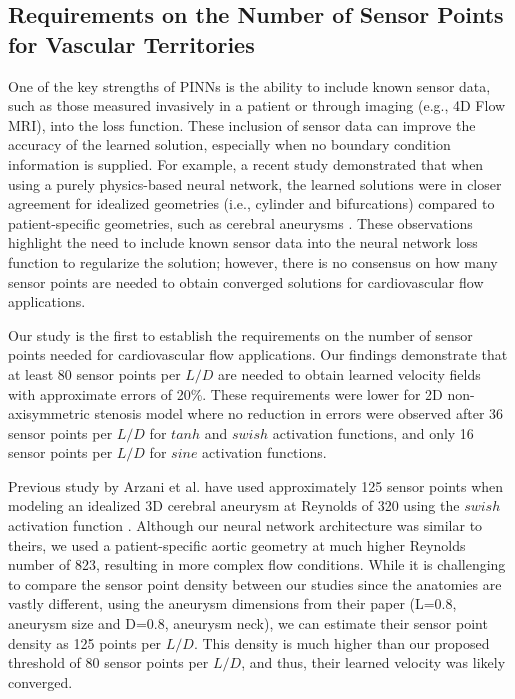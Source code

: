 \documentclass[times,twocolumn,final]{elsarticle}
\begin{document}
{\subsection {Requirements on the Number of Sensor Points for Vascular Territories}
One of the key strengths of PINNs is the ability to include known sensor data, such as those measured invasively in a patient or through imaging (e.g., 4D Flow MRI), into the loss function. These inclusion of sensor data can improve the accuracy of the learned solution, especially when no boundary condition information is supplied. For example, a recent study demonstrated that when using a purely physics-based neural network, the learned solutions were in closer agreement for idealized geometries (i.e., cylinder and bifurcations) compared to patient-specific geometries, such as cerebral aneurysms \citep{Moser2023_PINNs}. These observations highlight the need to include known sensor data into the neural network loss function to regularize the solution; however, there is no consensus on how many sensor points are needed to obtain converged solutions for cardiovascular flow applications.

Our study is the first to establish the requirements on the number of sensor points needed for cardiovascular flow applications. Our findings demonstrate that at least 80 sensor points per $L/D$ are needed to obtain learned velocity fields with approximate errors of 20\%. These requirements were lower for 2D non-axisymmetric stenosis model where no reduction in errors were observed after 36 sensor points per $L/D$ for $tanh$ and $swish$ activation functions, and only 16 sensor points per $L/D$ for $sine$ activation functions. 

Previous study by Arzani et al. have used approximately 125 sensor points when modeling an idealized 3D cerebral aneurysm at Reynolds of 320 using the $swish$ activation function \citep{Arzani2021_PINNs}. Although our neural network architecture was similar to theirs, we used a patient-specific aortic geometry at much higher Reynolds number of 823,  resulting in more complex flow conditions. While it is challenging to compare the sensor point density between our studies since the anatomies are vastly different, using the aneurysm dimensions from their paper (L=0.8, aneurysm size and D=0.8, aneurysm neck), we can estimate their sensor point density as 125 points per $L/D$. This density is much higher than our proposed threshold of 80 sensor points per $L/D$, and thus, their learned velocity was likely converged. 

}
\end{document}
